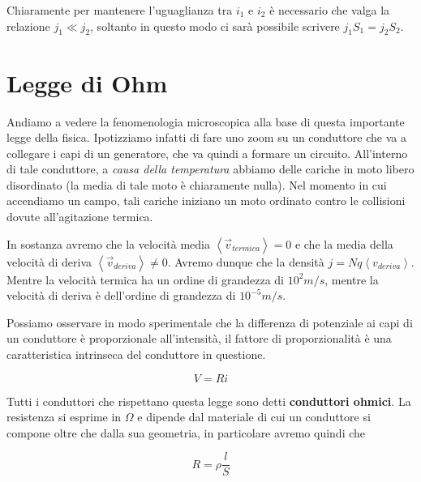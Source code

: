 Chiaramente per mantenere l'uguaglianza tra $i_1$ e $i_2$ è necessario che valga la relazione $j_1 	\ll j_2$, soltanto in questo modo ci sarà possibile scrivere $j_1S_1 = j_2S_2$.

\section{Legge di Ohm}
Andiamo a vedere la fenomenologia microscopica alla base di questa importante legge della fisica. Ipotizziamo infatti di fare uno zoom su un conduttore che va a collegare i capi di un generatore, che va quindi a formare un circuito. All'interno di tale conduttore, a \textit{causa della temperatura} abbiamo delle cariche in moto libero disordinato (la media di tale moto è chiaramente nulla). Nel momento in cui accendiamo un campo, tali cariche iniziano un moto ordinato contro le collisioni dovute all'agitazione termica. 

In sostanza avremo che la velocità media $\left< \vec{v}_{termica}\right> = 0$ e che la media della velocità di deriva $\left< \vec{v}_{deriva} \right> \ne 0$. Avremo dunque che la densità $j = Nq\left< v_{deriva} \right>$. Mentre la velocità termica ha un ordine di grandezza di $10^2 m/s$, mentre la velocità di deriva è dell'ordine di grandezza di $10^{-5} m/s$.

\medskip

Possiamo osservare in modo sperimentale che la differenza di potenziale ai capi di un conduttore è proporzionale all'intensità, il fattore di proporzionalità è una caratteristica intrinseca del conduttore in questione. 

\begin{tcolorbox}[colframe=red, colback=red!10, title=Legge di Ohm]
	\begin{large}
		\begin{equation}
			V = Ri
		\end{equation}
	\end{large}
\end{tcolorbox}

Tutti i conduttori che rispettano questa legge sono detti \textbf{conduttori ohmici}. La resistenza si esprime in $\Omega$ e dipende dal materiale di cui un conduttore si compone oltre che dalla sua geometria, in particolare avremo quindi che 

\begin{large}
	\begin{equation}
		R = \rho \frac{l}{S}
	\end{equation}
\end{large}

